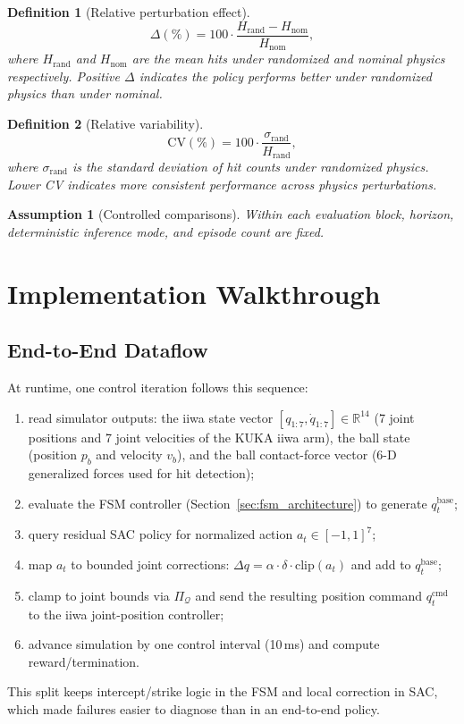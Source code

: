 \documentclass[10pt,twocolumn,letterpaper]{article}
\newtheorem{definition}{Definition}
\newtheorem{assumption}{Assumption}
\begin{document}
\begin{definition}[Relative perturbation effect]
\[
\Delta(\%)=100\cdot\frac{H_{\mathrm{rand}}-H_{\mathrm{nom}}}{H_{\mathrm{nom}}},
\]
where $H_{\mathrm{rand}}$ and $H_{\mathrm{nom}}$ are the mean hits under randomized and nominal physics respectively. Positive $\Delta$ indicates the policy performs \emph{better} under randomized physics than under nominal.
\end{definition}

\begin{definition}[Relative variability]
\[
\mathrm{CV}(\%)=100\cdot\frac{\sigma_{\mathrm{rand}}}{H_{\mathrm{rand}}},
\]
where $\sigma_{\mathrm{rand}}$ is the standard deviation of hit counts under randomized physics. Lower CV indicates more consistent performance across physics perturbations.
\end{definition}

\begin{assumption}[Controlled comparisons]
Within each evaluation block, horizon, deterministic inference mode, and episode count are fixed.
\end{assumption}

\section{Implementation Walkthrough}
\subsection{End-to-End Dataflow}
At runtime, one control iteration follows this sequence:
\begin{enumerate}[leftmargin=*,noitemsep]
    \item read simulator outputs: the iiwa state vector $[q_{1:7}, \dot{q}_{1:7}] \in \mathbb{R}^{14}$ (7 joint positions and 7 joint velocities of the KUKA iiwa arm), the ball state (position $p_b$ and velocity $v_b$), and the ball contact-force vector (6-D generalized forces used for hit detection);
    \item evaluate the FSM controller (Section~\ref{sec:fsm_architecture}) to generate $q_t^{\mathrm{base}}$;
    \item query residual SAC policy for normalized action $a_t \in [-1,1]^7$;
    \item map $a_t$ to bounded joint corrections: $\Delta q = \alpha \cdot \delta \cdot \mathrm{clip}(a_t)$ and add to $q_t^{\mathrm{base}}$;
    \item clamp to joint bounds via $\Pi_{\mathcal{Q}}$ and send the resulting position command $q_t^{\mathrm{cmd}}$ to the iiwa joint-position controller;
    \item advance simulation by one control interval (10\,ms) and compute reward/termination.
\end{enumerate}
This split keeps intercept/strike logic in the FSM and local correction in SAC, which made failures easier to diagnose than in an end-to-end policy.
\end{document}
